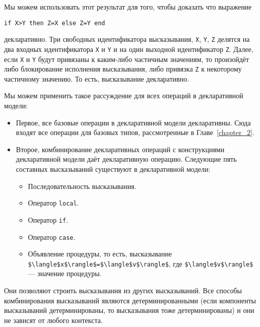 Мы можем использовать этот результат для того, чтобы доказать что выражение

\begin{lstlisting}
if X>Y then Z=X else Z=Y end
\end{lstlisting}

декларативно. Три свободных идентификатора высказывания, \lstinline!X!, \lstinline!Y!, \lstinline!Z! делятся на два входных идентификатора \lstinline!X! и \lstinline!Y! и на один выходной идентификатор \lstinline!Z!. Далее, если \lstinline!X! и \lstinline!Y! будут привязаны к каким-либо частичным значениям, то произойдёт либо блокирование исполнения высказывания, либо привязка \lstinline!Z! к некоторому частичному значению. То есть, высказывание декларативно.

Мы можем применить такое рассуждение для всех операций в декларативной модели:

\begin{itemize}
\item{Первое, все базовые операции в декларативной модели декларативны. Сюда входят все операции для базовых типов, рассмотренные в Главе~\ref{chapter_2}.}

\item{Второе, комбинирование декларативных операций с конструкциями декларативной модели даёт декларативную операцию. Следующие пять составных высказываний существуют в декларативной модели:
  \begin{itemize}
\item{Последовательность высказывания.}

\item{Оператор \lstinline!local!.}

\item{Оператор \lstinline!if!.}

\item{Оператор \lstinline!case!.}

\item{Объявление процедуры, то есть, высказывание \lstinline!$\langle$x$\rangle$=$\langle$v$\rangle$!, где \lstinline!$\langle$v$\rangle$! --- значение процедуры.}
  \end{itemize}
}
\end{itemize}

Они позволяют строить высказывания из других высказываний. Все способы комбинирования высказываний являются детерминированными (если компоненты высказываний детерминированы, то высказывания тоже детерминированы) и они не зависят от любого контекста.

